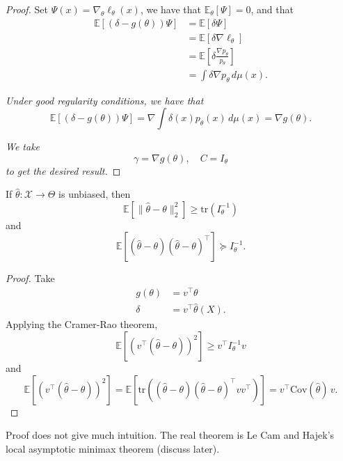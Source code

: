 \begin{proof}
Set $\Psi(x) = \nabla_\theta \ell_\theta(x)$, we have that $\mathbb{E}_\theta[\Psi] = 0$, 
and that
\begin{align*}
  \mathbb{E}[(\delta - g(\theta))\Psi] 
  &= \mathbb{E}[\delta \Psi] \\
  &= \mathbb{E}[\delta \nabla \ell_\theta] \\
  &= \mathbb{E}\!\left[\delta \frac{\nabla p_\theta}{p_\theta}\right] \\
  &= \int \delta \nabla p_\theta\, d\mu(x).
\end{align*}

\textit{Under good regularity conditions, we have that}
\[
  \mathbb{E}[(\delta - g(\theta))\Psi] 
  = \nabla \int \delta(x) p_\theta(x)\, d\mu(x) 
  = \nabla g(\theta).
\]

\textit{We take}
\[
  \gamma = \nabla g(\theta), \quad C = I_\theta
\]
\textit{to get the desired result.}
\end{proof}

\begin{cor}
If $\hat{\theta} : \mathcal{X} \to \Theta$ is unbiased, then
\[
  \mathbb{E}\!\left[\|\hat{\theta} - \theta\|_2^2\right] \ge \mathrm{tr}(I_\theta^{-1})
\]
and
\[
  \mathbb{E}[(\hat{\theta} - \theta)(\hat{\theta} - \theta)^\top] \succeq I_\theta^{-1}.
\]
\end{cor}

\begin{proof}
Take
\begin{align*}
  g(\theta) &= v^\top \theta \\
  \delta &= v^\top \hat{\theta}(X).
\end{align*}
Applying the Cramer-Rao theorem,
\[
  \mathbb{E}\!\left[(v^\top(\hat{\theta} - \theta))^2\right] \ge v^\top I_\theta^{-1} v
\]
and
\[
  \mathbb{E}\!\left[(v^\top(\hat{\theta} - \theta))^2\right] 
  = \mathbb{E}\!\left[\mathrm{tr}\!\left((\hat{\theta} - \theta)(\hat{\theta} - \theta)^\top v v^\top\right)\right] 
  = v^\top \mathrm{Cov}(\hat{\theta})\, v.
\]
\end{proof}

\begin{rem}
    Proof does not give much intuition. The real theorem is Le Cam and Hajek’s local asymptotic minimax theorem (discuss later).
\end{rem}


